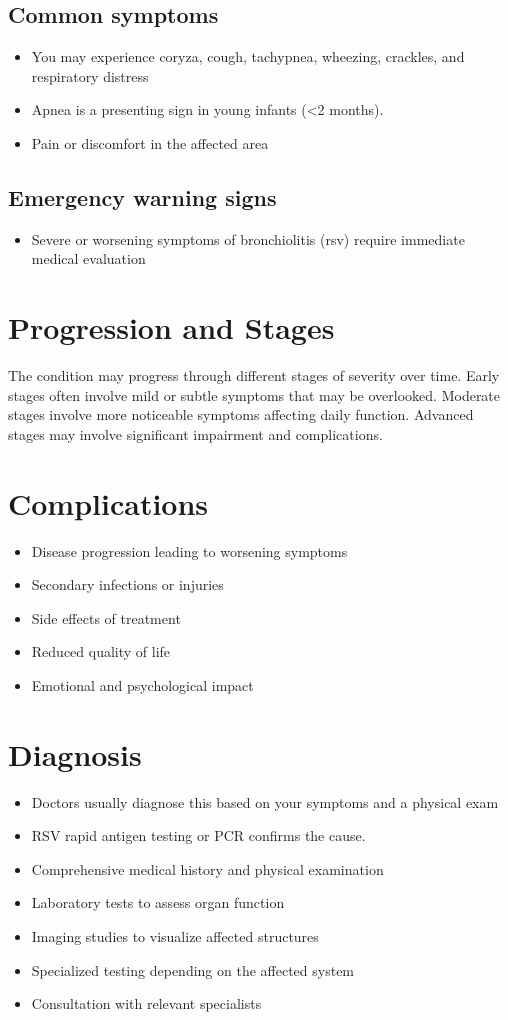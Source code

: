 \subsection{Common symptoms}
\begin{itemize}[noitemsep]
  \item You may experience coryza, cough, tachypnea, wheezing, crackles, and respiratory distress
  \item Apnea is a presenting sign in young infants (<2 months).
  \item Pain or discomfort in the affected area
  \end{itemize}

\subsection{Emergency warning signs}
\begin{itemize}[noitemsep]
  \item Severe or worsening symptoms of bronchiolitis (rsv) require immediate medical evaluation
\end{itemize}
\section{Progression and Stages}
The condition may progress through different stages of severity over time. Early stages often involve mild or subtle symptoms that may be overlooked. Moderate stages involve more noticeable symptoms affecting daily function. Advanced stages may involve significant impairment and complications.
\section{Complications}
\begin{itemize}[noitemsep]
  \item Disease progression leading to worsening symptoms
  \item Secondary infections or injuries
  \item Side effects of treatment
  \item Reduced quality of life
  \item Emotional and psychological impact
\end{itemize}
\section{Diagnosis}
\begin{itemize}[noitemsep]
  \item Doctors usually diagnose this based on your symptoms and a physical exam
  \item RSV rapid antigen testing or PCR confirms the cause.
  \item Comprehensive medical history and physical examination
  \item Laboratory tests to assess organ function
  \item Imaging studies to visualize affected structures
  \item Specialized testing depending on the affected system
  \item Consultation with relevant specialists
\end{itemize}
